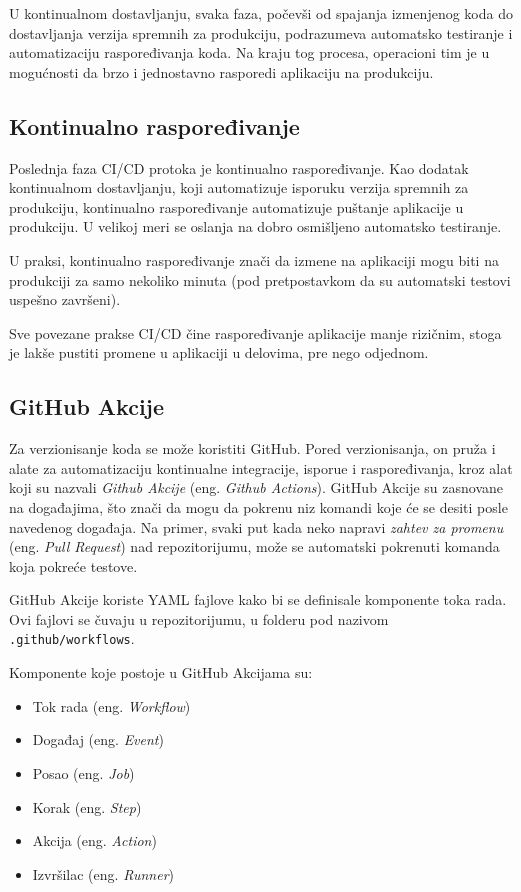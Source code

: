 U kontinualnom dostavljanju, svaka faza, počevši od spajanja izmenjenog koda do dostavljanja 
verzija spremnih za produkciju, podrazumeva automatsko testiranje i automatizaciju raspoređivanja 
koda. Na kraju tog procesa, operacioni tim je u mogućnosti da brzo i jednostavno rasporedi 
aplikaciju na produkciju.

\subsection{Kontinualno raspoređivanje}
Poslednja faza CI/CD protoka je kontinualno raspoređivanje. Kao dodatak kontinualnom dostavljanju, 
koji automatizuje isporuku verzija spremnih za produkciju, kontinualno raspoređivanje automatizuje 
puštanje aplikacije u produkciju. U velikoj meri se oslanja na dobro osmišljeno automatsko testiranje.

U praksi, kontinualno raspoređivanje znači da izmene na aplikaciji mogu biti na produkciji za samo 
nekoliko minuta (pod pretpostavkom da su automatski testovi uspešno završeni).

Sve povezane prakse CI/CD čine raspoređivanje aplikacije manje rizičnim, stoga je lakše pustiti 
promene u aplikaciji u delovima, pre nego odjednom.~\cite{CI_CD}

\subsection{GitHub Akcije}
Za verzionisanje koda se može koristiti GitHub. Pored verzionisanja, on pruža i alate za automatizaciju 
kontinualne integracije, isporue i raspoređivanja, kroz alat koji su nazvali \textit{Github Akcije} 
(eng. \textit{Github Actions}). 
GitHub Akcije su zasnovane na događajima, što znači da mogu da pokrenu niz komandi koje će se desiti 
posle navedenog događaja. Na primer, svaki put kada neko napravi \textit{zahtev za promenu} 
(eng. \textit{Pull Request}) nad repozitorijumu, može se automatski pokrenuti komanda koja pokreće 
testove. 

GitHub Akcije koriste YAML fajlove kako bi se definisale komponente toka rada. Ovi fajlovi se čuvaju 
u repozitorijumu, u folderu pod nazivom \mbox{\texttt{.github/workflows}}.

Komponente koje postoje u GitHub Akcijama su: 

\begin{itemize}
    \item Tok rada (eng. \textit{Workflow})
    \item Događaj (eng. \textit{Event})
    \item Posao (eng. \textit{Job})
    \item Korak (eng. \textit{Step})
    \item Akcija (eng. \textit{Action})
    \item Izvršilac (eng. \textit{Runner})
\end{itemize}

